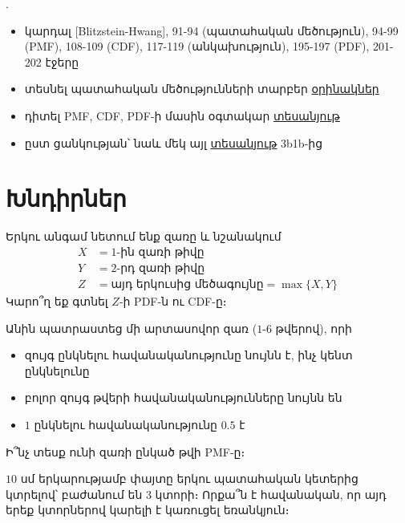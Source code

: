 \bigskip 

\begin{theory}
.
\begin{itemize}
\item կարդալ [{\rm Blitzstein-Hwang}], 91-94 (պատահական մեծու\-թյուն), 94-99 ({\rm PMF}), 108-109 ({\rm CDF}), 117-119 (անկախու\-թյուն), 195-197 ({\rm PDF}), 201-202 էջերը 
\item տեսնել պատահական մեծությունների տարբեր \href{https://dlsun.github.io/skis/continuous/random-variables.html}{օրինակներ}
\item դիտել {\aroff PMF, CDF, PDF}-ի մասին օգտակար \href{https://www.youtu.be/yRbfLlTmPE8
}{տեսանյութ}
\item ըստ ցանկության՝ նաև մեկ այլ \href{https://youtu.be/IaSGqQa5O-M}{տեսանյութ} {\rm 3b1b}-ից
\end{itemize}
\end{theory}

\newpage

\section{Խնդիրներ}

\begin{problem}
Երկու անգամ նետում ենք զառը և նշանակում
\begin{align*}
X &= 1\text{-ին զառի թիվը} \\
Y &= 2\text{-րդ զառի թիվը} \\
Z &= \text{այդ երկուսից մեծագույնը} = \max\{X, Y\} 
\end{align*}
Կարո՞ղ եք գտնել $Z$-ի {\rm PDF}-ն ու {\rm CDF}-ը։
\end{problem}

\begin{problem}
Անին պատրաստեց մի արտասովոր զառ ($1$-$6$ թվերով), որի
\begin{itemize}
    \item զույգ ընկնելու հավանականությունը նույնն է, ինչ կենտ ընկնելունը
    \item բոլոր զույգ թվերի հավանականությունները նույնն են
    \item $1$ ընկնելու հավանականությունը $0.5$ է
\end{itemize}
Ի՞նչ տեսք ունի զառի ընկած թվի {\rm PMF}-ը։
\end{problem}

\begin{problem}
$10$ սմ երկարությամբ փայտը երկու պատահական կետերից կտրելով՝ բաժանում են $3$ կտորի։ Որքա՞ն է հավանական, որ այդ երեք կտորներով կարելի է կառուցել եռանկյուն։

\end{problem}

